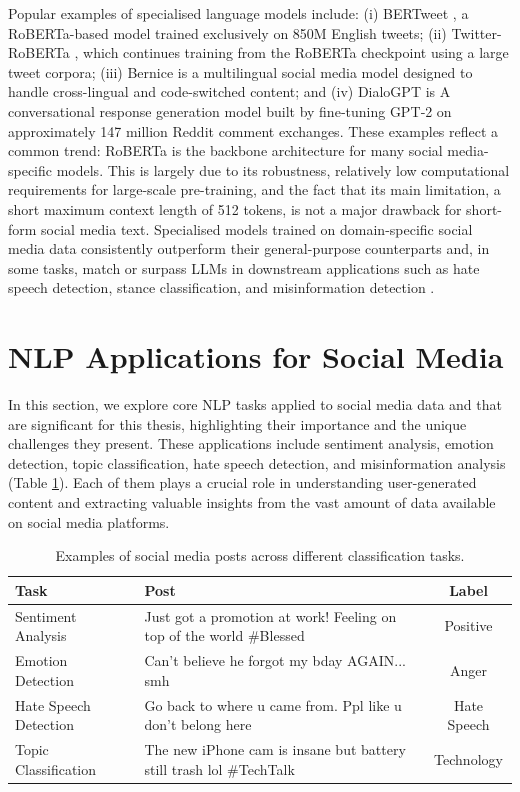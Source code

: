 Popular examples of specialised language models include: (i) BERTweet \cite{bertweet}, a RoBERTa-based model trained exclusively on 850M English tweets; (ii) Twitter-RoBERTa \cite{loureiro-etal-2022-timelms}, which continues training from the RoBERTa checkpoint using a large tweet corpora; (iii) 
Bernice \cite{delucia2022bernice} is a multilingual social media model designed to handle cross-lingual and code-switched content; and  (iv) DialoGPT \cite{zhang2019dialogpt} is A conversational response generation model built by fine‑tuning GPT‑2 on approximately 147 million Reddit comment exchanges. These examples reflect a common trend: RoBERTa is the backbone architecture for many social media-specific models. This is largely due to its robustness, relatively low computational requirements for large-scale pre-training, and the fact that its main limitation, a short maximum context length of 512 tokens, is not a major drawback for short-form social media text. Specialised models trained on domain-specific social media data consistently outperform their general-purpose counterparts and, in some tasks, match or surpass \acp{LLM} in downstream applications such as hate speech detection, stance classification, and misinformation detection \cite{monnar2024cross}.


\section{NLP Applications for Social Media}

In this section, we explore core \ac{NLP} tasks applied to social media data and that are significant for this thesis, highlighting their importance and the unique challenges they present. These applications include sentiment analysis, emotion detection, topic classification, hate speech detection, and misinformation analysis (Table \ref{tab:task_examples}). Each of them plays a crucial role in understanding user-generated content and extracting valuable insights from the vast amount of data available on social media platforms.



\begin{table}[ht]
\centering
\begin{tabular}{|l|p{8cm}|c|}
\hline
\textbf{Task} & \centering \textbf{Post} & \textbf{Label} \\
\hline
Sentiment Analysis & Just got a promotion at work! Feeling on top of the world  \#Blessed & Positive \\
\hline
Emotion Detection & Can't believe he forgot my bday AGAIN... smh  & Anger \\
\hline
Hate Speech Detection & Go back to where u came from. Ppl like u don’t belong here & Hate Speech \\
\hline
Topic Classification & The new iPhone cam is insane but battery still trash lol \#TechTalk & Technology \\
\hline
\end{tabular}
\caption{Examples of social media posts across different classification tasks.}
\label{tab:task_examples}
\end{table}


